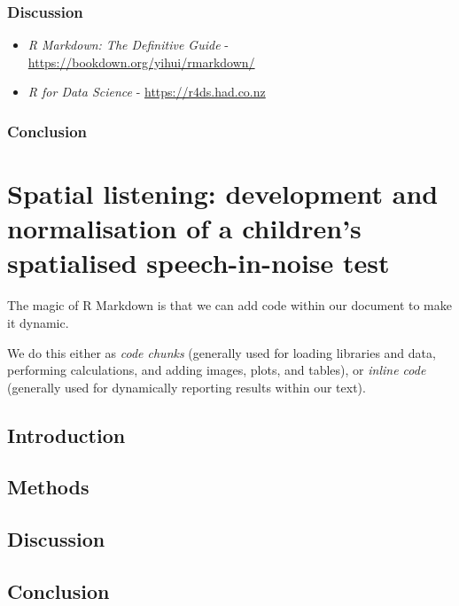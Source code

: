 \documentclass[a4paper, twoside]{templates/ociamthesis}
\begin{document}
\hypertarget{discussion-2}{%
\subsection{Discussion}\label{discussion-2}}

\begin{itemize}
\item
  \emph{R Markdown: The Definitive Guide} - \url{https://bookdown.org/yihui/rmarkdown/}
\item
  \emph{R for Data Science} - \url{https://r4ds.had.co.nz}
\end{itemize}

\hypertarget{conclusion}{%
\subsection{Conclusion}\label{conclusion}}

\hypertarget{code}{%
\chapter{Spatial listening: development and normalisation of a children's spatialised speech-in-noise test}\label{code}}

\minitoc 

The magic of R Markdown is that we can add code within our document to make it dynamic.

We do this either as \emph{code chunks} (generally used for loading libraries and data, performing calculations, and adding images, plots, and tables), or \emph{inline code} (generally used for dynamically reporting results within our text).

\hypertarget{introduction-3}{%
\section{Introduction}\label{introduction-3}}

\hypertarget{methods-3}{%
\section{Methods}\label{methods-3}}

\hypertarget{discussion-3}{%
\section{Discussion}\label{discussion-3}}

\hypertarget{conclusion-1}{%
\section{Conclusion}\label{conclusion-1}}
\end{document}
